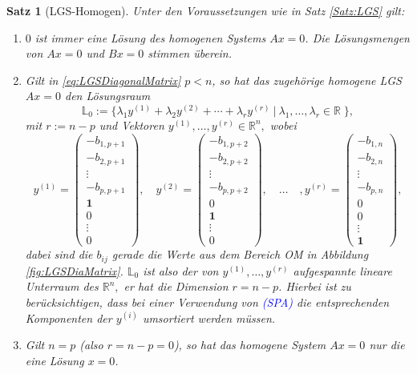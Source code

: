 \documentclass[a4paper,11pt,oneside]{article}
\newtheorem{theorem}{Satz}
\theoremstyle{definition}
\def\OP#1{\textcolor{blue}{(\textnormal{\textrm{\textsc{#1}})}}}
\begin{document}
\begin{theorem}[LGS-Homogen]\label{Satz:LGShomogen}
Unter den Voraussetzungen wie in Satz \ref{Satz:LGS} gilt:
\begin{enumerate}
\item
$0$ ist immer eine Lösung des homogenen Systems $Ax=0$. Die Lösungsmengen von $ Ax=0$ und $Bx=0$ stimmen überein.
\item
Gilt in \eqref{eq:LGSDiagonalMatrix} $p<n$, so hat das zugehörige homogene LGS $Ax=0$ den Lösungsraum
$$
{\mathbb L}_0:=\big\{\lambda_1 y^{(1)}+ \lambda_2 y^{(2)} +\cdots +\lambda_r y^{(r)} \
\big|\ \lambda_1 ,\ldots,\lambda_r \in\mathbb R\;\big\},
$$
mit $r:=n-p$ und Vektoren $y^{(1)},\ldots,y^{(r)}\in\mathbb R^n,$ wobei
\begin{equation}\label{eq:LGSHomLsg}
y^{(1)}=
\begin{pmatrix}
-b_{1,p+1}\\
-b_{2,p+1}\\
\vdots\\
-b_{p,p+1}\\
\mathbf{1}\\
0\\
\vdots\\
0
\end{pmatrix},\quad
y^{(2)}=
\begin{pmatrix}
-b_{1,p+2}\\
-b_{2,p+2}\\
\vdots\\
-b_{p,p+2}\\
0\\
\mathbf{1}\\
\vdots\\
0
\end{pmatrix},\quad\ldots\quad,
y^{(r)}=
\begin{pmatrix}
-b_{1,n}\\
-b_{2,n}\\
\vdots\\
-b_{p,n}\\
0\\
0\\
\vdots\\
\mathbf{1}
\end{pmatrix},
\end{equation}
dabei sind die $ b_{ij}$ gerade die Werte aus dem Bereich \textsf{OM} in Abbildung \ref{fig:LGSDiaMatrix}. ${\mathbb L}_0$ ist also der von $y^{(1)},\ldots,y^{(r)}$ aufgespannte lineare Unterraum des $\mathbb R^n,$ er hat die Dimension $r=n-p$. Hierbei ist zu berücksichtigen, dass bei einer Verwendung von \OP{SPA} die entsprechenden Komponenten der $y^{(i)}$ umsortiert werden müssen.
\item
Gilt $n=p$ (also $ r=n-p=0$), so hat das homogene System $Ax=0$ \emph{nur} die eine Lösung $x=0$.
\end{enumerate}
\end{theorem}
\end{document}
